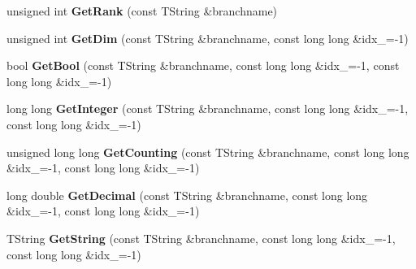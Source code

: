 \begin{DoxyCompactItemize}
\item 
\hypertarget{class_h_a_l_1_1_analysis_tree_reader_aa4dae5db1c660155760ded68007cdd6d}{unsigned int {\bfseries Get\-Rank} (const T\-String \&branchname)}\label{class_h_a_l_1_1_analysis_tree_reader_aa4dae5db1c660155760ded68007cdd6d}

\item 
\hypertarget{class_h_a_l_1_1_analysis_tree_reader_a1a8c741c6b2ae788b98d596c12543724}{unsigned int {\bfseries Get\-Dim} (const T\-String \&branchname, const long long \&idx\-\_=-\/1)}\label{class_h_a_l_1_1_analysis_tree_reader_a1a8c741c6b2ae788b98d596c12543724}

\item 
\hypertarget{class_h_a_l_1_1_analysis_tree_reader_a8a76466f4746d4764b0fa97416182267}{bool {\bfseries Get\-Bool} (const T\-String \&branchname, const long long \&idx\-\_=-\/1, const long long \&idx\-\_=-\/1)}\label{class_h_a_l_1_1_analysis_tree_reader_a8a76466f4746d4764b0fa97416182267}

\item 
\hypertarget{class_h_a_l_1_1_analysis_tree_reader_a6b2e01f1075ed295513a268258d3d559}{long long {\bfseries Get\-Integer} (const T\-String \&branchname, const long long \&idx\-\_=-\/1, const long long \&idx\-\_=-\/1)}\label{class_h_a_l_1_1_analysis_tree_reader_a6b2e01f1075ed295513a268258d3d559}

\item 
\hypertarget{class_h_a_l_1_1_analysis_tree_reader_aa4d264484021ba0912f6254aeacc784f}{unsigned long long {\bfseries Get\-Counting} (const T\-String \&branchname, const long long \&idx\-\_=-\/1, const long long \&idx\-\_=-\/1)}\label{class_h_a_l_1_1_analysis_tree_reader_aa4d264484021ba0912f6254aeacc784f}

\item 
\hypertarget{class_h_a_l_1_1_analysis_tree_reader_a4a3dd2065768228ab817575307c4691e}{long double {\bfseries Get\-Decimal} (const T\-String \&branchname, const long long \&idx\-\_=-\/1, const long long \&idx\-\_=-\/1)}\label{class_h_a_l_1_1_analysis_tree_reader_a4a3dd2065768228ab817575307c4691e}

\item 
\hypertarget{class_h_a_l_1_1_analysis_tree_reader_a75c0fe7d907ac8f1792ff496e4cf0b73}{T\-String {\bfseries Get\-String} (const T\-String \&branchname, const long long \&idx\-\_=-\/1, const long long \&idx\-\_=-\/1)}\label{class_h_a_l_1_1_analysis_tree_reader_a75c0fe7d907ac8f1792ff496e4cf0b73}


\end{DoxyCompactItemize}
